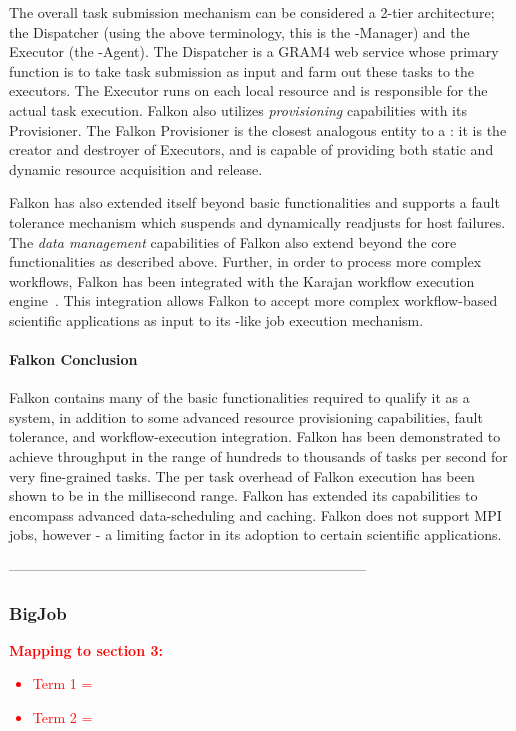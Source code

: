 \documentclass{sig-alternate}
\begin{document}
The overall task submission mechanism can be considered
a 2-tier architecture; the Dispatcher (using the above terminology,
this is the \pilot-Manager) and the Executor (the \pilot-Agent). 
The Dispatcher is a GRAM4 web service whose primary
function is to take task submission as input and farm
out these tasks to the executors. The Executor runs on
each local resource and is responsible for the actual
task execution. Falkon also utilizes \textit{provisioning}
capabilities with its Provisioner. The Falkon Provisioner is the 
closest analogous entity to a \pilot: it is the creator and 
destroyer of Executors, and is capable of 
providing both static and dynamic resource
acquisition and release.

Falkon has also extended itself beyond basic \pilotjob functionalities
and supports a fault tolerance mechanism which suspends and
dynamically readjusts for host failures. The \textit{data management}
capabilities of Falkon also extend beyond the core \pilotjob
functionalities as described above. Further, in order 
to process more complex workflows, Falkon has been integrated
with the Karajan workflow execution engine~\cite{karajan}. This
integration allows Falkon to accept more complex workflow-based
scientific applications as input to its \pilot-like job execution
mechanism.

\paragraph{Falkon Conclusion}
Falkon contains many of the basic functionalities required to 
qualify it as a \pilotjob system, in addition to some advanced resource
provisioning capabilities, fault tolerance, and workflow-execution integration.
Falkon has been demonstrated to achieve throughput in the range
of hundreds to thousands of tasks per second for very fine-grained
tasks. The per task overhead of Falkon execution has been shown
to be in the millisecond range. Falkon has extended its capabilities
to encompass advanced data-scheduling and caching. Falkon does
not support MPI jobs, however - a limiting factor in its adoption to
certain scientific applications.

 -----------------------------------------------------------------------------

\subsubsection{BigJob}

\textcolor{red}
{
\textbf{Mapping to section 3:}
\begin{itemize}
\item Term 1 =
\item Term 2 =
\end{itemize}
}
\end{document}
